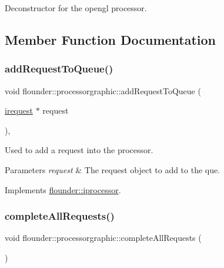 Deconstructor for the opengl processor. 



\subsection{Member Function Documentation}
\mbox{\label{classflounder_1_1processorgraphic_a28c8b84c3f8066ff9b3cf01a18e8c18a}} 
\subsubsection{\texorpdfstring{add\+Request\+To\+Queue()}{addRequestToQueue()}}
{\footnotesize\ttfamily void flounder\+::processorgraphic\+::add\+Request\+To\+Queue (\begin{DoxyParamCaption}\item[{\hyperlink{classflounder_1_1irequest}{irequest} $\ast$}]{request }\end{DoxyParamCaption})\hspace{0.3cm}{\ttfamily [override]}, {\ttfamily [virtual]}}



Used to add a request into the processor. 


\begin{DoxyParams}{Parameters}
{\em request} & The request object to add to the que. \\
\hline
\end{DoxyParams}


Implements \hyperlink{classflounder_1_1iprocessor_ad721814a6a2c69f526527c7b2f57a11b}{flounder\+::iprocessor}.

\mbox{\label{classflounder_1_1processorgraphic_a359c0516c7ff2730cf287452b4080fbb}} 
\subsubsection{\texorpdfstring{complete\+All\+Requests()}{completeAllRequests()}}
{\footnotesize\ttfamily void flounder\+::processorgraphic\+::complete\+All\+Requests (\begin{DoxyParamCaption}{ }\end{DoxyParamCaption})}




